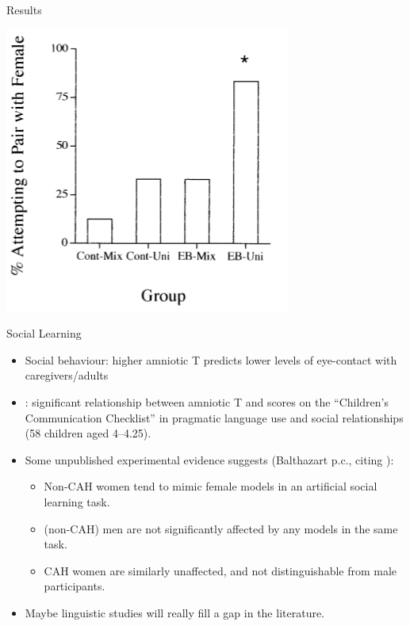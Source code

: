 \documentclass[hyperref={pdfpagelabels=false}]{beamer}
\begin{document}
\begin{frame}{\citet{mansukhanietal1996}}
\begin{block}{Results}
\begin{center}
	\includegraphics[width=.7\textwidth]{figures/gaybirds.png}
	\end{center}
\end{block}
\end{frame}

\begin{frame}{Social Learning}
\begin{itemize}

	\item Social behaviour: higher amniotic T predicts lower levels of eye-contact with caregivers/adults \citep{lutchmayaetal2002}
	\item \citet{knickmeyeretal2005}: significant relationship between amniotic T and scores on the ``Children's Communication Checklist'' in pragmatic language use and social relationships (58 children aged 4--4.25).
	\item Some unpublished experimental evidence suggests (Balthazart p.c., citing \citealt{hines2012}):
		\begin{itemize}
			\item Non-CAH women tend to mimic female models in an artificial social learning task.
			\item (non-CAH) men are not significantly affected by any models in the same task.
			\item CAH women are similarly unaffected, and not distinguishable from male participants.
		\end{itemize}
	\item Maybe linguistic studies will really fill a gap in the literature.
\end{itemize}

\end{frame}
\end{document}
